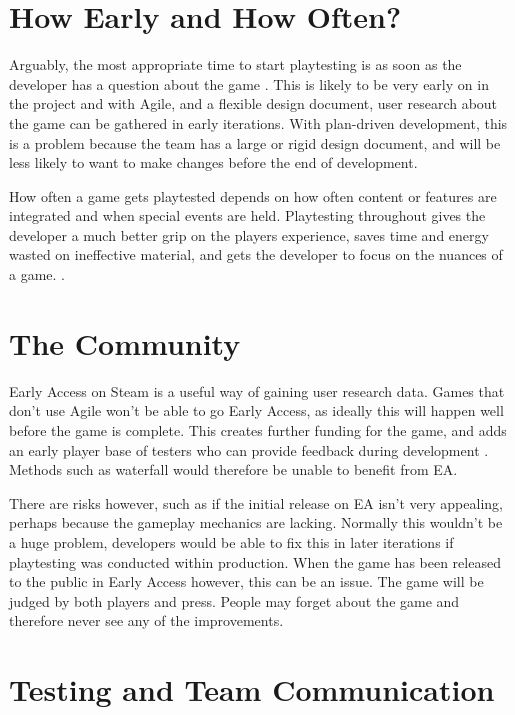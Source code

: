 \documentclass{scrartcl}
\begin{document}
\section{How Early and How Often?}

Arguably, the most appropriate time to start playtesting is as soon as the developer has a question about the game \cite{GDCSharks:14}. This is likely to be very early on in the project and with Agile, and a flexible design document, user research about the game can be gathered in early iterations. With plan-driven development, this is a problem because the team has a large or rigid design document, and will be less likely to want to make changes before the end of development. \par
How often a game gets playtested depends on how often content or features are integrated and when special events are held. Playtesting throughout gives the developer a much better grip on the players experience, saves time and energy wasted on ineffective material, and gets the developer to focus on the nuances of a game. \cite{GDCAED:15}.


\section{The Community}

Early Access on Steam is a useful way of gaining user research data\cite{GamesEA:16}. 
Games that don't use Agile won't be able to go Early Access, as ideally this will happen well before the game is complete. This creates further funding for the game, and adds an early player base of testers who can provide feedback during development \cite{GDCOTC:5}. Methods such as waterfall would therefore be unable to benefit from EA. \par

There are risks however, such as if the initial release on EA isn't very appealing, perhaps because the gameplay mechanics are lacking. Normally this wouldn't be a huge problem, developers would be able to fix this in later iterations if playtesting was conducted within production. When the game has been released to the public in Early Access however, this can be an issue. The game will be judged by both players and press. People may forget about the game and therefore never see any of the improvements.

\section{Testing and Team Communication}
\end{document}
